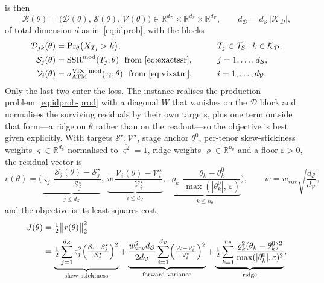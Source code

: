 \documentclass[11pt]{article}
\newcommand{\R}{\mathbb{R}}
\newcommand{\SSR}{\mathrm{SSR}}
\newcommand{\SSRmod}{\SSR^{\mathrm{mod}}}
\newcommand{\ivVIX}{\sigma^{\mathrm{VIX}}_{\mathrm{ATM}}}
\providecommand{\1}{\mathbf 1}
\begin{document}
is then
\begin{equation}\label{eq:objvec}
  \mathcal{R}(\theta)=\bigl(\mathcal{D}(\theta),\,\mathcal{S}(\theta),\,\mathcal{V}(\theta)\bigr)
  \in\R^{d_{\mathcal{D}}}\times\R^{d_{\mathcal{S}}}\times\R^{d_{\mathcal{V}}},
  \qquad d_{\mathcal{D}}=d_{\mathcal{S}}\,|\mathcal{K}_{\mathcal{D}}|,
\end{equation}
of total dimension $d$ as in~\eqref{eq:idprob}, with the blocks
\begin{alignat}{2}
  \mathcal{D}_{jk}(\theta)&=\Pr\nolimits_{\theta}\bigl(X_{T_j}>k\bigr),&\qquad
    &T_j\in\mathcal{T}_{\mathcal{S}},\ k\in\mathcal{K}_{\mathcal{D}},\label{eq:blockD}\\
  \mathcal{S}_j(\theta)&=\SSRmod(T_j;\theta)\ \ \text{from~\eqref{eq:exactssr}},&
    &j=1,\dots,d_{\mathcal{S}},\label{eq:blockS}\\
  \mathcal{V}_i(\theta)&=\ivVIX{}^{\,\mathrm{mod}}(\tau_i;\theta)\ \ \text{from~\eqref{eq:vixatm}},&
    &i=1,\dots,d_{\mathcal{V}}.\label{eq:blockV}
\end{alignat}
Only the last two enter the loss. The instance realises the production
problem~\eqref{eq:idprob-prod} with a diagonal $W$ that vanishes on the $\mathcal D$ block and normalises the surviving residuals by their
own targets, plus one term outside that form---a ridge on $\theta$ rather than on the readout---so the
objective is best given explicitly. With targets $\mathcal{S}^{\star},\mathcal{V}^{\star}$, stage
anchor $\theta^{0}$, per-tenor skew-stickiness weights $\varsigma\in\R^{d_{\mathcal{S}}}$ normalised
to $\overline{\varsigma^2}=1$, ridge weights $\varrho\in\R^{n_\theta}$ and a floor $\varepsilon>0$,
the residual vector is
\begin{equation}\label{eq:resid}
  r(\theta)=\biggl(
    \underbrace{\varsigma_j\,\frac{\mathcal{S}_j(\theta)-\mathcal{S}^{\star}_j}{\mathcal{S}^{\star}_j}}_{j\le d_{\mathcal{S}}},\;
    \underbrace{w\,\frac{\mathcal{V}_i(\theta)-\mathcal{V}^{\star}_i}{\mathcal{V}^{\star}_i}}_{i\le d_{\mathcal{V}}},\;
    \underbrace{\varrho_k\,\frac{\theta_k-\theta^{0}_k}{\max(|\theta^{0}_k|,\,\varepsilon)}}_{k\le n_\theta}
  \biggr),
  \qquad w=w_{\mathrm{vov}}\sqrt{\frac{d_{\mathcal{S}}}{d_{\mathcal{V}}}},
\end{equation}
and the objective is its least-squares cost,
\begin{equation}\label{eq:loss}
\begin{aligned}
  J(\theta)&=\tfrac12\bigl\|r(\theta)\bigr\|_2^{2}\\[2pt]
  &=\underbrace{\tfrac12\sum_{j=1}^{d_{\mathcal{S}}}\varsigma_j^{2}
      \Bigl(\tfrac{\mathcal{S}_j-\mathcal{S}^{\star}_j}{\mathcal{S}^{\star}_j}\Bigr)^{2}}_{\text{skew-stickiness}}
  +\underbrace{\frac{w_{\mathrm{vov}}^{2}d_{\mathcal{S}}}{2d_{\mathcal{V}}}\sum_{i=1}^{d_{\mathcal{V}}}
      \Bigl(\tfrac{\mathcal{V}_i-\mathcal{V}^{\star}_i}{\mathcal{V}^{\star}_i}\Bigr)^{2}}_{\text{forward variance}}
  +\underbrace{\tfrac12\sum_{k=1}^{n_\theta}
      \frac{\varrho_k^{2}(\theta_k-\theta^{0}_k)^{2}}{\max(|\theta^{0}_k|,\varepsilon)^{2}}}_{\text{ridge}},
\end{aligned}
\end{equation}
\end{document}

